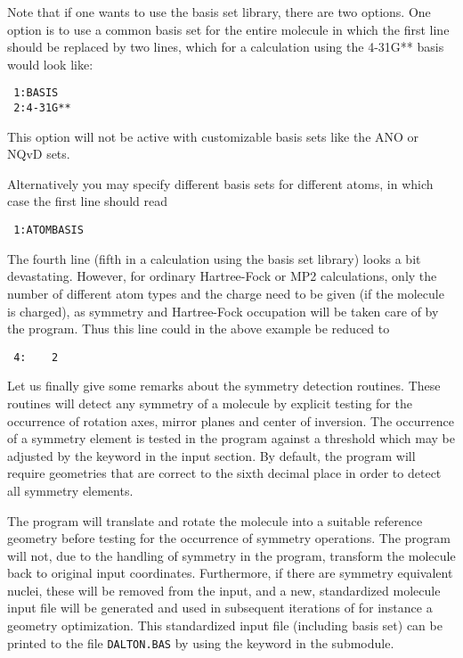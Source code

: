 Note that if one wants to use the basis set library, there are two
options. One option is to use a common basis set for the entire
molecule in which the first line should be replaced by two lines,
which for a calculation using the 4-31G** basis would look like:
\begin{verbatim}
 1:BASIS
 2:4-31G**
\end{verbatim}
This option will not be active with customizable basis sets like the
ANO or NQvD sets.

Alternatively you may specify different basis sets for different
atoms, in which case the first line should read
\begin{verbatim}
 1:ATOMBASIS
\end{verbatim}

The fourth line (fifth in a calculation using the basis set library)
looks a bit devastating. However, for ordinary
Hartree-Fock or MP2
calculations, only the number of different atom types and the charge
need to be given (if the molecule is charged), as symmetry and
Hartree-Fock occupation will be taken
care of by the program. Thus
this line could in the above example be reduced to
\begin{verbatim}
 4:    2
\end{verbatim}

Let us finally give some remarks about the symmetry
detection
routines. These routines will detect any symmetry of a molecule
by explicit testing for the occurrence of rotation axes, mirror planes
and center of inversion. The occurrence of a symmetry element is
tested in the program against a threshold which may be adjusted by the
keyword  in the  input section. By default,
the program will require
geometries that are correct to the sixth decimal place in order to
detect all symmetry elements.

The program will translate and rotate the molecule into a suitable
reference geometry before testing for the occurrence of symmetry
operations. The program will not, due to the handling of symmetry
in the program, transform  the molecule back to original input
coordinates. Furthermore, if there are symmetry equivalent nuclei,
these will be removed from the input, and a new, standardized
molecule input file will be generated and used in subsequent
iterations of for instance a geometry optimization. This
standardized input file (including basis set) can be printed to
the file \verb|DALTON.BAS| by using the keyword  in
the  submodule.


